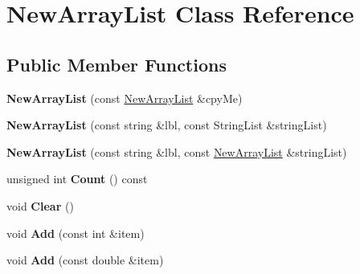 \hypertarget{classrrc_1_1_new_array_list}{\section{New\-Array\-List Class Reference}
\label{classrrc_1_1_new_array_list}
}
\subsection*{Public Member Functions}
\begin{DoxyCompactItemize}
\item 
\hypertarget{classrrc_1_1_new_array_list_a7f04eb92a9c5a3cbc8f7a6a02adb58b8}{{\bfseries New\-Array\-List} (const \hyperlink{classrrc_1_1_new_array_list}{New\-Array\-List} \&cpy\-Me)}\label{classrrc_1_1_new_array_list_a7f04eb92a9c5a3cbc8f7a6a02adb58b8}

\item 
\hypertarget{classrrc_1_1_new_array_list_a45619b91f4dcc804ef5eb700ed9a343f}{{\bfseries New\-Array\-List} (const string \&lbl, const String\-List \&string\-List)}\label{classrrc_1_1_new_array_list_a45619b91f4dcc804ef5eb700ed9a343f}

\item 
\hypertarget{classrrc_1_1_new_array_list_a7227581a4399eaabc273dad9137d9df6}{{\bfseries New\-Array\-List} (const string \&lbl, const \hyperlink{classrrc_1_1_new_array_list}{New\-Array\-List} \&string\-List)}\label{classrrc_1_1_new_array_list_a7227581a4399eaabc273dad9137d9df6}

\item 
\hypertarget{classrrc_1_1_new_array_list_a074f9905a87bb9395d21d9f4bc8c459f}{unsigned int {\bfseries Count} () const }\label{classrrc_1_1_new_array_list_a074f9905a87bb9395d21d9f4bc8c459f}

\item 
\hypertarget{classrrc_1_1_new_array_list_aa71d36872f416feaa853788a7a7a7ef8}{void {\bfseries Clear} ()}\label{classrrc_1_1_new_array_list_aa71d36872f416feaa853788a7a7a7ef8}

\item 
\hypertarget{classrrc_1_1_new_array_list_a17caac96dcd8cceab22322f020519706}{void {\bfseries Add} (const int \&item)}\label{classrrc_1_1_new_array_list_a17caac96dcd8cceab22322f020519706}

\item 
\hypertarget{classrrc_1_1_new_array_list_a5c371a159c312404e83375094cd64e89}{void {\bfseries Add} (const double \&item)}\label{classrrc_1_1_new_array_list_a5c371a159c312404e83375094cd64e89}


\end{DoxyCompactItemize}
